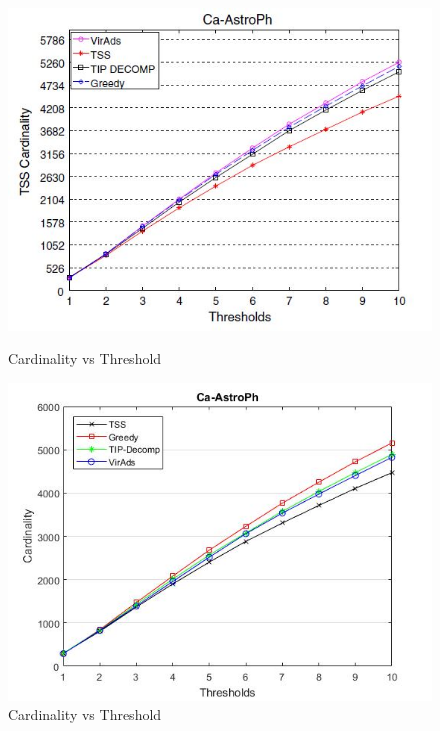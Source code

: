 \begin{figure}[h!]
\begin{minipage}[t]{0.50\textwidth}
\includegraphics[width=\linewidth,keepaspectratio=true]{images/ca-astrophpaper.jpg}
\caption{Cardinality vs Threshold}
\label{fase1}
\end{minipage}
\begin{minipage}[t]{0.50\textwidth}
\includegraphics[width=\linewidth,keepaspectratio=true]{images/ca-astrophresult.jpg}
\caption{Cardinality vs Threshold}
\end{minipage}
\end{figure}

